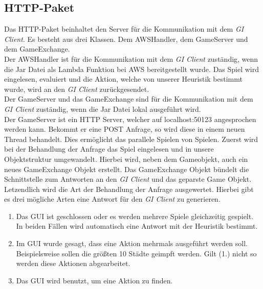 \documentclass{article}
\let\oldgls\gls
\renewcommand{\gls}[1]{\emph{\oldgls{#1}}} %
\begin{document}
\subsection{HTTP-Paket}
Das HTTP-Paket beinhaltet den Server für die Kommunikation mit dem \gls{GI Client}. Es besteht aus drei Klassen. Dem AWSHandler, dem GameServer und dem GameExchange. \\
Der AWSHandler ist für die Kommunikation mit dem \gls{GI Client} zuständig, wenn die Jar Datei als Lambda Funktion bei AWS bereitgestellt wurde. Das Spiel wird eingelesen, evaluiert und die Aktion, welche von unserer Heuristik bestimmt wurde, wird an den \gls{GI Client} zurückgesendet. \\
Der GameServer und das GameExchange sind für die Kommunikation mit dem \gls{GI Client} zuständig, wenn die Jar Datei lokal ausgeführt wird. \\
Der GameServer ist ein HTTP Server, welcher auf localhost:50123 
angesprochen werden kann. Bekommt er eine POST Anfrage, so wird diese in einem neuen Thread behandelt. Dies ermöglicht das parallele Spielen von Spielen. Zuerst wird bei der Behandlung der Anfrage das Spiel eingelesen und in unsere Objektstruktur umgewandelt. Hierbei wird, neben dem Gameobjekt, auch ein neues GameExchange Objekt erstellt. Das GameExchange Objekt bündelt die Schnittstelle zum Antworten an den \gls{GI Client} und das geparste Game Objekt. Letzendlich wird die Art der Behandlung der Anfrage ausgewertet. Hierbei gibt es drei mögliche Arten eine Antwort für den \gls{GI Client} zu generieren.
\begin{enumerate}
    \item Das GUI ist geschlossen oder es werden mehrere Spiele gleichzeitig gespielt. In beiden Fällen wird automatisch eine Antwort mit der Heuristik bestimmt.
    \item Im GUI wurde gesagt, dass eine Aktion mehrmals ausgeführt werden soll. Beispielsweise sollen die größten 10 Städte geimpft werden. Gilt (1.)  nicht so werden diese Aktionen abgearbeitet.
    \item Das GUI wird benutzt, um eine Aktion zu finden.
\end{enumerate}
\end{document}
